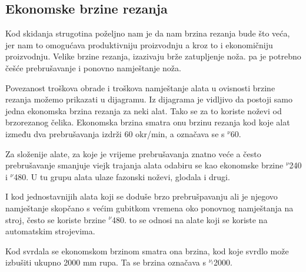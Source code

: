 \documentclass[a4paper,12pt]{article}
\numberwithin{figure}{section}
\begin{document}
\subsection{Ekonomske brzine rezanja}
Kod skidanja strugotina poželjno nam je da nam brzina rezanja bude što veća, jer nam to omogućava produktivniju proizvodnju a kroz to i ekonomičniju proizvodnju. Velike brzine rezanja, izazivaju brže zatupljenje noža. pa je potrebno češće prebrušavanje i ponovno namještanje noža. \par
Povezanost troškova obrade i troškova namještanje alata u ovisnosti brzine rezanja možemo prikazati u dijagramu.
Iz dijagrama je vidljivo da postoji samo jedna ekonomska brzina rezanja za neki alat. Tako se za to koriste noževi od brzorezanog čelika. Ekonomska brzina smatra onu brzinu rezanja kod koje alat između dva prebrušavanja izdrži 60 okr/min, a označava se s $^{\nu}$60.\par 
Za složenije alate, za koje je vrijeme prebrušavanja znatno veće a često prebrušavanje smanjuje viejk trajanja alata odabiru se kao ekonomske brzine $^{\nu}$240 i $^{\nu}$480. U tu grupu alata ulaze fazonski noževi, glodala i drugi. \par
I kod jednostavnijih alata koji se doduše brzo prebrušpavanju ali je njegovo namještanje skopčano s većim gubitkom vremena oko ponovnog namještanja na stroj, često se koriste brzine $^{\nu}$480. to se odnosi na alate koji se koriste na automatskim strojevima. \par
Kod svrdala se ekonomskom brzinom smatra ona brzina, kod koje svrdlo može izbušiti ukupno 2000 mm rupa. Ta se brzina označava s $^{\nu_{l}}$2000.
\end{document}
